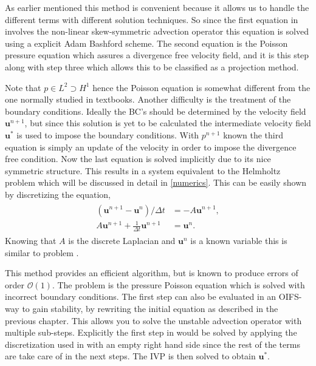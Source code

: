 As earlier mentioned this method is convenient because it allows us to handle the different 
terms with different solution techniques. So since the first equation in 
involves the non-linear skew-symmetric advection operator this equation is solved using a 
explicit Adam Bashford scheme. The second equation is the Poisson pressure equation which
assures a divergence free velocity field, and it is this step along with step three which 
allows this to be classified as a projection method.

Note that $p\in L^2\supset H^1$ hence the Poisson equation 
is somewhat different from the one normally studied in textbooks. Another difficulty is the 
treatment of the boundary conditions. Ideally the BC's should be determined by the velocity 
field $\mathbf{u}^{n+1}$, but since this solution is yet to be calculated the intermediate velocity field 
$\mathbf{u}^{*}$ is used to impose the boundary conditions. With $p^{n+1}$ known the third equation is 
simply an update of the velocity in order to impose the divergence free condition. Now the last
equation is solved implicitly due to its nice symmetric structure. This results in a system 
equivalent to the Helmholtz problem which will be discussed in detail in \cref{numerics}.
This can be easily shown by discretizing the equation, 
\begin{align}
    \begin{split}
    (\mathbf{u}^{n+1}-\mathbf{u}^{n})/\Delta t  &= -A\mathbf{u}^{n+1},\\
    A\mathbf{u}^{n+1}+\frac{1}{\Delta t} \mathbf{u}^{n+1} &= \mathbf{u}^{n}.
    \end{split}
    \label{eq:fracHelm}
\end{align}
Knowing that $A$ is the discrete Laplacian and $\mathbf{u}^n$ is a known variable this is 
similar to problem .


This method provides an efficient algorithm, but is known to produce errors of order
$\mathcal{O}(1)$.
The problem is the pressure Poisson equation which is solved with incorrect boundary 
conditions. The first step can also be evaluated in an OIFS-way to gain stability,
by rewriting the initial equation as described in the previous chapter. This allows you 
to solve the unstable advection operator with multiple sub-steps. Explicitly the first step 
in  would be solved by applying the discretization used in 
with an empty right hand side since the rest of the terms are take care of in the next steps. 
The IVP  is then solved to obtain $\mathbf{u}^{*}$.

